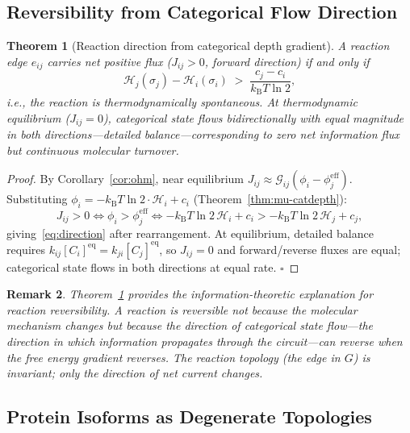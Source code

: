 \documentclass[twocolumn,10pt,a4paper]{article}
\newcommand{\kB}{k_{\mathrm{B}}}
\newcommand{\Hcat}{\mathcal{H}}
\newcommand{\Gcond}{\mathcal{G}}
\newtheorem{theorem}{Theorem}[section]
\newtheorem{remark}[theorem]{Remark}
\begin{document}
\subsection{Reversibility from Categorical Flow Direction}
\label{sec:prop-reversibility}

\begin{theorem}[Reaction direction from categorical depth gradient]
\label{thm:direction}
A reaction edge $e_{ij}$ carries net positive flux ($J_{ij}>0$, forward
direction) if and only if
\begin{equation}
  \Hcat_j(\sigma_j) - \Hcat_i(\sigma_i) \;>\;
    \frac{c_j - c_i}{\kB T\ln 2},
  \label{eq:direction}
\end{equation}
i.e., the reaction is thermodynamically spontaneous.  At thermodynamic
equilibrium ($J_{ij}=0$), categorical state flows bidirectionally with equal
magnitude in both directions---detailed balance---corresponding to zero net
information flux but continuous molecular turnover.
\end{theorem}

\begin{proof}
By Corollary~\ref{cor:ohm}, near equilibrium
$J_{ij}\approx\Gcond_{ij}(\phi_i-\phi_j^{\mathrm{eff}})$.  Substituting
$\phi_i=-\kB T\ln 2\cdot\Hcat_i+c_i$ (Theorem~\ref{thm:mu-catdepth}):
\[
  J_{ij}>0 \Leftrightarrow \phi_i > \phi_j^{\mathrm{eff}}
  \Leftrightarrow -\kB T\ln 2\,\Hcat_i+c_i > -\kB T\ln 2\,\Hcat_j+c_j,
\]
giving~\eqref{eq:direction} after rearrangement.  At equilibrium, detailed
balance~\cite{Lewis1925} requires $k_{ij}[C_i]^{\mathrm{eq}}=
k_{ji}[C_j]^{\mathrm{eq}}$, so $J_{ij}=0$ and forward/reverse fluxes are
equal; categorical state flows in both directions at equal rate.  $\square$
\end{proof}

\begin{remark}
Theorem~\ref{thm:direction} provides the information-theoretic explanation for
reaction reversibility.  A reaction is reversible not because the molecular
mechanism changes but because the direction of categorical state flow---the
direction in which information propagates through the circuit---can reverse
when the free energy gradient reverses.  The reaction topology (the edge in
$G$) is invariant; only the direction of net current changes.
\end{remark}

\subsection{Protein Isoforms as Degenerate Topologies}
\label{sec:prop-isoforms}
\end{document}
